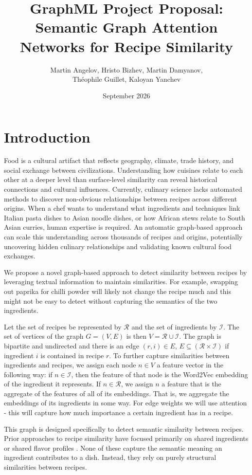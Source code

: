 \documentclass{article}
\title{GraphML Project Proposal: Semantic Graph Attention Networks for Recipe Similarity}
\author{Martin Angelov, Hristo Bizhev, Martin Damyanov,\\ Théophile Guillet, Kaloyan Yanchev}
\date{September 2026}
\begin{document}
\maketitle

\section{Introduction}
Food is a cultural artifact that reflects geography, climate, trade history, and social exchange between civilizations. Understanding how cuisines relate to each other at a deeper level than surface-level similarity can reveal historical connections and cultural influences. Currently, culinary science lacks automated methods to discover non-obvious relationships between recipes across different origins. When a chef wants to understand what ingredients and techniques link Italian pasta dishes to Asian noodle dishes, or how African stews relate to South Asian curries, human expertise is required. An automatic graph-based approach can scale this understanding across thousands of recipes and origins, potentially uncovering hidden culinary relationships and validating known cultural food exchanges.

We propose a novel graph-based approach to detect similarity between recipes by leveraging textual information to maintain similarities. For example, swapping out paprika for chilli powder will likely not change the recipe much and this might not be easy to detect without capturing the semantics of the two ingredients. 

Let the set of recipes be represented by $\mathcal{R}$ and the set of ingredients by $\mathcal{I}$. The set of vertices of the graph $G = (V, E)$ is then $V = \mathcal{R} \cup \mathcal{I}$. The graph is bipartite and undirected and there is an edge $(r, i) \in E$, $E \subseteq (\mathcal{R} \times \mathcal{I})$ if ingredient $i$ is contained in recipe $r$. To further capture similarities between ingredients and recipes, we assign each node $n \in V$ a feature vector in the following way: if $n \in \mathcal{I}$, then the feature of that node is the Word2Vec embedding of the ingredient it represents. If $n \in \mathcal{R}$, we assign $n$ a feature that is the aggregate of the features of all of its embeddings. That is, we aggregate the embeddings of its ingredients in some way. For edge weights we will use attention - this will capture how much importance a certain ingredient has in a recipe.

This graph is designed specifically to detect semantic similarity between recipes. Prior approaches to recipe similarity have focused primarily on shared ingredients \cite{bellingeri_recipe_2025,kular_using_2011} or shared flavor profiles \cite{ahn_flavor_2011,simas_food-bridging_2017}. None of these capture the semantic meaning an ingredient contributes to a dish. Instead, they rely on purely structural similarities between recipes.
\end{document}
